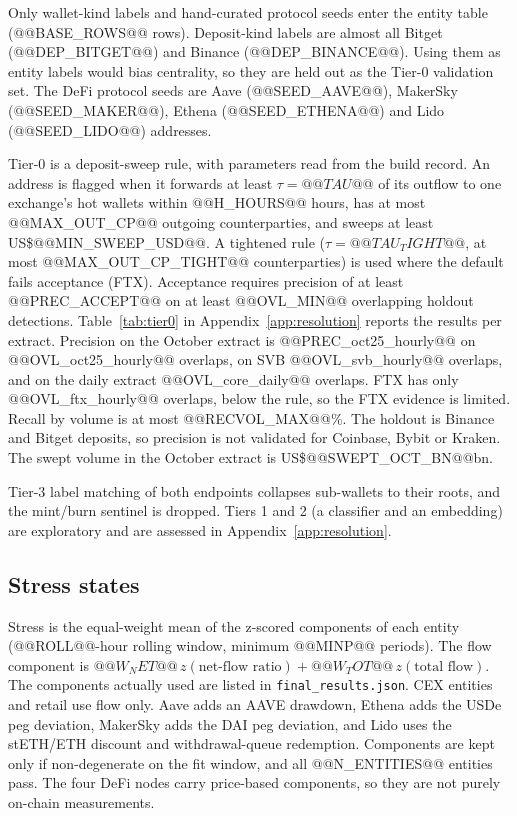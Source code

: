 \documentclass[referee,pdflatex,sn-mathphys-ay]{sn-jnl}
\theoremstyle{thmstyleone}%
\theoremstyle{thmstyletwo}%
\theoremstyle{thmstylethree}%
\begin{document}
Only wallet-kind labels and hand-curated protocol seeds enter the entity table (@@BASE_ROWS@@ rows).
Deposit-kind labels are almost all Bitget (@@DEP_BITGET@@) and Binance (@@DEP_BINANCE@@). Using them as entity
labels would bias centrality, so they are held out as the Tier-0 validation set. The DeFi protocol seeds are
Aave (@@SEED_AAVE@@), MakerSky (@@SEED_MAKER@@), Ethena (@@SEED_ETHENA@@) and Lido (@@SEED_LIDO@@) addresses.

Tier-0 is a deposit-sweep rule, with parameters read from the build record. An address is flagged when it
forwards at least $\tau=@@TAU@@$ of its outflow to one exchange's hot wallets within @@H_HOURS@@ hours, has at most
@@MAX_OUT_CP@@ outgoing counterparties, and sweeps at least US\$@@MIN_SWEEP_USD@@. A tightened rule
($\tau=@@TAU_TIGHT@@$, at most @@MAX_OUT_CP_TIGHT@@ counterparties) is used where the default fails acceptance (FTX).
Acceptance requires precision of at least @@PREC_ACCEPT@@ on at least @@OVL_MIN@@ overlapping holdout detections. Table~\ref{tab:tier0}
in Appendix~\ref{app:resolution} reports the results per extract. Precision on the October extract is
@@PREC_oct25_hourly@@ on @@OVL_oct25_hourly@@ overlaps, on SVB @@OVL_svb_hourly@@ overlaps, and on the daily extract
@@OVL_core_daily@@ overlaps. FTX has only @@OVL_ftx_hourly@@ overlaps, below the rule, so the FTX evidence is limited.
Recall by volume is at most @@RECVOL_MAX@@\%. The holdout is Binance and Bitget deposits, so precision is not validated for
Coinbase, Bybit or Kraken. The swept volume in the October extract is US\$@@SWEPT_OCT_BN@@bn.

Tier-3 label matching of both endpoints collapses sub-wallets to their roots, and the mint/burn sentinel is dropped.
Tiers 1 and 2 (a classifier and an embedding) are exploratory and are assessed in Appendix~\ref{app:resolution}.

\subsection{Stress states}
\label{subsec:stress}
Stress is the equal-weight mean of the z-scored components of each entity (@@ROLL@@-hour rolling window, minimum @@MINP@@
periods). The flow component is $@@W_NET@@\,z(\text{net-flow ratio})+@@W_TOT@@\,z(\text{total flow})$. The components actually used are listed in
\texttt{final\_results.json}. CEX entities and retail use flow only. Aave adds an AAVE drawdown, Ethena adds
the USDe peg deviation, MakerSky adds the DAI peg deviation, and Lido uses the stETH/ETH discount and withdrawal-queue
redemption. Components are kept only if non-degenerate on the fit window, and all @@N_ENTITIES@@ entities pass.
The four DeFi nodes carry price-based components, so they are not purely on-chain measurements.
\end{document}
